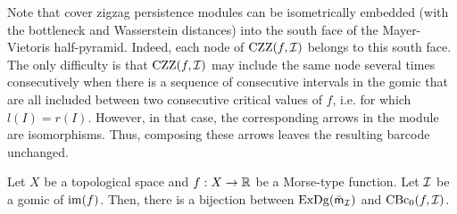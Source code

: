 Note that cover zigzag persistence modules can be isometrically embedded (with the bottleneck and Wasserstein distances) 
into the south face of the Mayer-Vietoris half-pyramid. Indeed, each node of $\mathrm{CZZ}(f,\mathcal{I})$ belongs to this south face.
The only difficulty is that $\mathrm{CZZ}(f,\mathcal{I})$ may include the same node several times consecutively when there is a sequence of 
consecutive intervals in the gomic that are all included between two consecutive critical values of $f$, i.e. for which $l(I)=r(I)$. 
However, in that case, the corresponding arrows in the module are isomorphisms.
Thus, composing these arrows leaves the resulting barcode unchanged.  


\begin{lem}\label{lem:CoverZZ}
Let $X$ be a topological space and $f:X\rightarrow\mathbb{R}$ be a Morse-type function.
Let $\mathcal{I}$ %
be a gomic of ${\rm im}(f)$. %
Then, there is a bijection between $\mathrm{ExDg}(\bar {\sf{m}}_{\mathcal I})$ and $\mathrm{CBc}_0(f,\mathcal{I})$. 
\end{lem}

